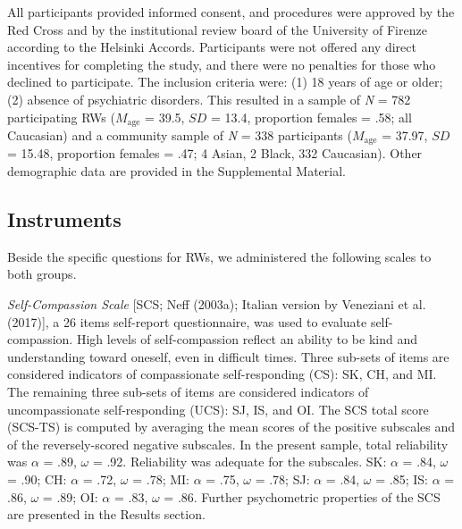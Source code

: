 \documentclass[
  man]{apa7}
\begin{document}
All participants provided informed consent, and procedures were approved by the Red Cross and by the institutional review board of the University of Firenze according to the Helsinki Accords. Participants were not offered any direct incentives for completing the study, and there were no penalties for those who declined to participate. The inclusion criteria were: (1) 18 years of age or older; (2) absence of psychiatric disorders. This resulted in a sample of \emph{N} = 782 participating RWs (\(M_{\text{age}}\) = 39.5, \(SD\) = 13.4, proportion females = .58; all Caucasian) and a community sample of \emph{N} = 338 participants (\(M_{\text{age}}\) = 37.97, \(SD\) = 15.48, proportion females = .47; 4 Asian, 2 Black, 332 Caucasian). Other demographic data are provided in the Supplemental Material.

\hypertarget{instruments}{%
\subsection{Instruments}\label{instruments}}

Beside the specific questions for RWs, we administered the following scales to both groups.

\emph{Self-Compassion Scale} {[}SCS; Neff (2003a); Italian version by Veneziani et al. (2017){]}, a 26 items self-report questionnaire, was used to evaluate self-compassion. High levels of self-compassion reflect an ability to be kind and understanding toward oneself, even in difficult times. Three sub-sets of items are considered indicators of compassionate self-responding (CS): SK, CH, and MI. The remaining three sub-sets of items are considered indicators of uncompassionate self-responding (UCS): SJ, IS, and OI. The SCS total score (SCS-TS) is computed by averaging the mean scores of the positive subscales and of the reversely-scored negative subscales. In the present sample, total reliability was \(\alpha\) = .89, \(\omega\) = .92. Reliability was adequate for the subscales. SK: \(\alpha\) = .84, \(\omega\) = .90; CH: \(\alpha\) = .72, \(\omega\) = .78; MI: \(\alpha\) = .75, \(\omega\) = .78; SJ: \(\alpha\) = .84, \(\omega\) = .85; IS: \(\alpha\) = .86, \(\omega\) = .89; OI: \(\alpha\) = .83, \(\omega\) = .86. Further psychometric properties of the SCS are presented in the Results section.
\end{document}
